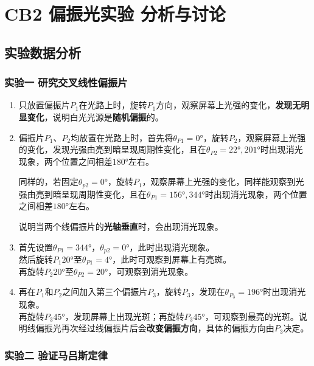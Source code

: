 \documentclass[dvipsnames, svgnames,a4paper,11pt]{article}
\begin{document}
\section{CB2 \quad 偏振光实验 \quad\heiti 分析与讨论}

\subsection{实验数据分析}

	\subsubsection{实验一 \quad 研究交叉线性偏振片}

	\begin{enumerate}
		\item 只放置偏振片$P_1$在光路上时，旋转$P_1$方向，观察屏幕上光强的变化，\textbf{发现无明显变化}，说明白光光源是\textbf{随机偏振}的。
		\item 偏振片$P_1$、$P_2$均放置在光路上时，首先将$\theta_{P1}=\ang{0}$，旋转$P_2$，观察屏幕上光强的变化，发现光强由亮到暗呈现周期性变化，且在$\theta_{P2}=\ang{22},\ang{201}$时出现消光现象，两个位置之间相差$\ang{180}$左右。
		
		同样的，若固定$\theta_{p2}=\ang{0}$，旋转$P_1$，观察屏幕上光强的变化，同样能观察到光强由亮到暗呈现周期性变化，且在$\theta_{P1}=\ang{156},\ang{344}$时出现消光现象，两个位置之间相差$\ang{180}$左右。

		说明当两个线偏振片的\textbf{光轴垂直}时，会出现消光现象。

		\item 首先设置$\theta_{P1}=\ang{344}$，$\theta_{p2}=\ang{0}$，此时出现消光现象。\\
			  然后旋转$P_1$$\ang{20}$至$\theta_{P1}=\ang{4}$，此时可观察到屏幕上有亮斑。\\
			  再旋转$P_2$$\ang{20}$至$\theta_{P2}=\ang{20}$，可观察到消光现象。

		\item 再在$P_1$和$P_2$之间加入第三个偏振片$P_3$，旋转$P_3$，发现在$\theta_{P_3}=\ang{196}$时出现消光现象。\\
			再旋转$P_3\ang{45}$，发现屏幕上出现光斑；再旋转$P_3\ang{45}$，可观察到最亮的光斑。说明线偏振光再次经过线偏振片后会\textbf{改变偏振方向}，具体的偏振方向由$P_3$决定。
	\end{enumerate}




	\subsubsection{实验二 \quad 验证马吕斯定律}
\end{document}
